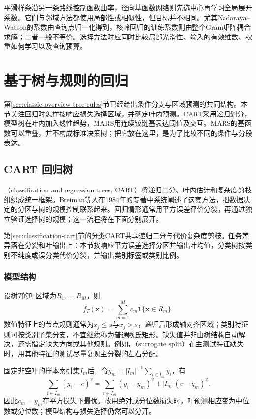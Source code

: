 平滑样条沿另一条路线控制函数曲率，径向基函数网络则先选中心再学习全局展开系数。它们与邻域方法都使用局部性或相似性，但目标并不相同。尤其Nadaraya--Watson的系数由查询点归一化得到，核岭回归的训练系数则由整个Gram矩阵耦合求解；二者一般不等价。选择方法时应同时比较局部光滑性、输入的有效维数、权重如何学习以及查询预算。

\section{基于树与规则的回归}
\label{sec:regression-trees}

第\ref{sec:classic-overview-tree-rules}节已经给出条件分支与区域预测的共同结构。本节关注回归时怎样按响应损失选择区域，并确定叶内预测。CART采用递归划分，模型树在叶内加入线性趋势，MARS用连续铰链基表达阈值及交互。MARS的基函数可以重叠，并不构成标准决策树；把它放在这里，是为了比较不同的条件与分段表达。

\subsection{CART 回归树}
\label{sec:regression-cart}

（classification and regression trees, CART）将递归二分、叶内估计和复杂度剪枝组织成统一框架。Breiman等人在1984年的专著中系统阐述了这套方法，把数据决定的分区与树的规模控制联系起来。回归情形通常用平方误差评价分裂，再通过独立验证选择树的规模；这一流程将在下面分别展开。

第\ref{sec:classification-cart}节的分类CART共享递归二分与代价复杂度剪枝。任务差异落在分裂和叶输出上：本节按响应平方误差选择分区并输出叶均值，分类树按类别不纯度或误分类代价分裂，并输出类别标签或类别比例。

\subsubsection{模型结构}

设树$T$的叶区域为$R_1,\ldots,R_M$，则
\begin{equation}
  f_T(\bm{x})=\sum_{m=1}^{M}c_m\mathbf{1}\{\bm{x}\in R_m\}.
  \label{eq:regression-cart-model}
\end{equation}
数值特征上的节点规则通常为$x_j\leq s$与$x_j>s$，递归后形成轴对齐区域；类别特征则可按类别子集分支，不宜继续称为普通欧氏矩形。缺失值并非由树结构自动解决，还需指定缺失方向或其他规则。例如，（surrogate split）在主测试特征缺失时，用其他特征的测试尽量复现主分裂的左右分配。

固定非空叶的样本索引集$I_m$后，令$\bar y_m=|I_m|^{-1}\sum_{i\in I_m}y_i$，有
\[
  \sum_{i\in I_m}(y_i-c)^2
  =\sum_{i\in I_m}(y_i-\bar y_m)^2+|I_m|(c-\bar y_m)^2.
\]
因此$c_m=\bar y_m$在平方损失下最优。改用绝对或分位数损失时，叶预测相应变为中位数或分位数；模型结构与损失选择仍然可以分开。

